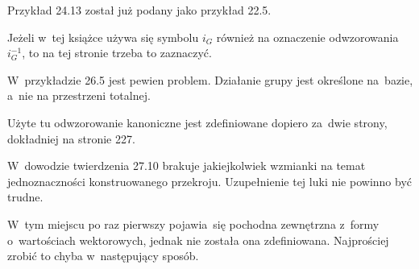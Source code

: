\documentclass[a4paper,11pt]{article}
\begin{document}
\vspace{\spaceFour}


\start {} Przykład 24.13 został już podany jako przykład 22.5.

\vspace{\spaceFour}


\start {} Jeżeli w~tej książce używa się symbolu $i_{ G }$
również na oznaczenie odwzorowania $i_{ G }^{ -1 }$, to na tej stronie
trzeba to zaznaczyć.

\vspace{\spaceFour}


\start {} W~przykładzie 26.5 jest pewien problem. Działanie
grupy jest określone na~bazie, a~nie na przestrzeni totalnej.

\vspace{\spaceFour}


\start {} Użyte tu odwzorowanie kanoniczne jest zdefiniowane
dopiero za~dwie strony, dokładniej na stronie 227.

\vspace{\spaceFour}


\start {} W~dowodzie twierdzenia 27.10 brakuje jakiejkolwiek
wzmianki na temat jednoznaczności konstruowanego przekroju.
Uzupełnienie tej luki nie powinno być trudne.

\vspace{\spaceFour}


\start {} W~tym miejscu po raz pierwszy pojawia~się pochodna
zewnętrzna z~formy o~wartościach wektorowych, jednak nie została ona
zdefiniowana. Najprościej zrobić to chyba w~następujący sposób.
\end{document}
